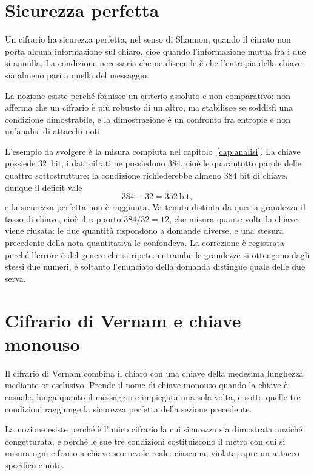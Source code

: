 \section{Sicurezza perfetta}

Un cifrario ha sicurezza perfetta, nel senso di Shannon, quando il cifrato non porta alcuna informazione sul chiaro, cioè quando l'informazione mutua fra i due si annulla. La condizione necessaria che ne discende è che l'entropia della chiave sia almeno pari a quella del messaggio.

La nozione esiste perché fornisce un criterio assoluto e non comparativo: non afferma che un cifrario è più robusto di un altro, ma stabilisce se soddisfi una condizione dimostrabile, e la dimostrazione è un confronto fra entropie e non un'analisi di attacchi noti.

L'esempio da svolgere è la misura compiuta nel capitolo~\ref{cap:analisi}. La chiave possiede \SI{32}{bit}, i dati cifrati ne possiedono $384$, cioè le quarantotto parole delle quattro sottostrutture; la condizione richiederebbe almeno $384$ bit di chiave, dunque il deficit vale
\begin{equation}
384 - 32 = 352 \ \text{bit},
\end{equation}
e la sicurezza perfetta non è raggiunta. Va tenuta distinta da questa grandezza il tasso di chiave, cioè il rapporto $384/32 = 12$, che misura quante volte la chiave viene riusata: le due quantità rispondono a domande diverse, e una stesura precedente della nota quantitativa le confondeva. La correzione è registrata perché l'errore è del genere che si ripete: entrambe le grandezze si ottengono dagli stessi due numeri, e soltanto l'enunciato della domanda distingue quale delle due serva.

\section{Cifrario di Vernam e chiave monouso}

Il cifrario di Vernam combina il chiaro con una chiave della medesima lunghezza mediante or esclusivo. Prende il nome di chiave monouso quando la chiave è casuale, lunga quanto il messaggio e impiegata una sola volta, e sotto quelle tre condizioni raggiunge la sicurezza perfetta della sezione precedente.

La nozione esiste perché è l'unico cifrario la cui sicurezza sia dimostrata anziché congetturata, e perché le sue tre condizioni costituiscono il metro con cui si misura ogni cifrario a chiave scorrevole reale: ciascuna, violata, apre un attacco specifico e noto.

